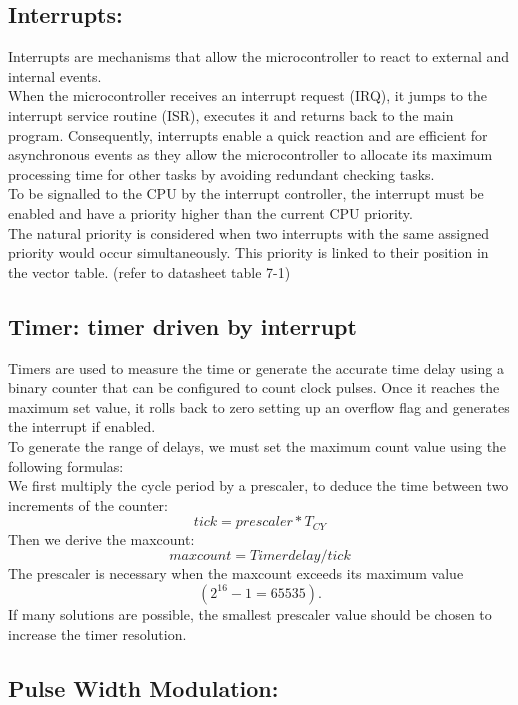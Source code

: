 \subsection{Interrupts:}

Interrupts are mechanisms that allow the microcontroller to react to external and internal events.\\
When the microcontroller receives an interrupt request (IRQ), it jumps to the interrupt service routine (ISR), executes it and returns back to the main program. 
Consequently, interrupts enable a quick reaction and are efficient for asynchronous events as they allow the microcontroller to allocate its maximum processing time for other tasks by avoiding redundant checking tasks.\\

To be signalled to the CPU by the interrupt controller, the interrupt must be enabled and have a priority higher than the current CPU priority.\\
The natural priority is considered when two interrupts with the same assigned priority would occur simultaneously. This priority is linked to their position in the vector table. (refer to datasheet table 7-1)

\subsection{Timer: timer driven by interrupt}

Timers are used to measure the time or generate the accurate time delay using a binary counter that can be configured to count clock pulses. Once it reaches the maximum set value, it rolls back to zero setting up an overflow flag and generates the interrupt if enabled. \\

To generate the range of delays, we must set the maximum count value using the following formulas:\\
We first multiply the cycle period by a prescaler, to deduce the time between two increments of the counter:
$$tick=prescaler*T_{CY}$$
Then we derive the maxcount:
$$maxcount=Timer delay/tick$$
The prescaler is necessary when the maxcount exceeds its maximum value $$(2^{16}-1=65535).$$ 
If many solutions are possible, the smallest prescaler value should be chosen to increase the timer resolution. 

\subsection{Pulse Width Modulation:} 

